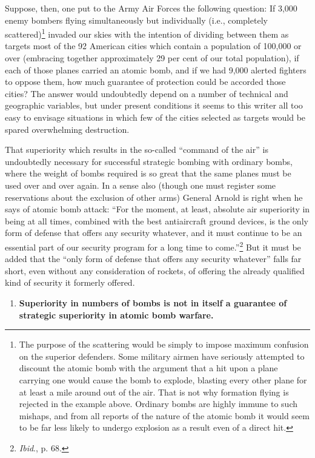 Suppose, then, one put to the Army Air Forces the following question: If 3,000 enemy bombers flying simultaneously but individually (i.e., completely scattered)\footnote{The purpose of the scattering would be simply to impose maximum confusion on the superior defenders. Some military airmen have seriously attempted to discount the atomic bomb with the argument that a hit upon a plane carrying one would cause the bomb to explode, blasting every other plane for at least a mile around out of the air. That is not why formation flying is rejected in the example above. Ordinary bombs are highly immune to such mishaps, and from all reports of the nature of the atomic bomb it would seem to be far less likely to undergo explosion as a result even of a direct hit.} invaded our skies with the intention of dividing between them as targets most of the 92 American cities which contain a population of 100,000 or over (embracing together approximately 29 per cent of our total population), if each of those planes carried an atomic bomb, and if we had 9,000 alerted fighters to oppose them, how much guarantee of protection could be accorded those cities? The answer would undoubtedly depend on a number of technical and geographic variables, but under present conditions it seems to this writer all too easy to envisage situations in which few of the cities selected as targets would be spared overwhelming destruction.

That superiority which results in the so-called ``command of the air'' is undoubtedly necessary for successful strategic bombing with ordinary bombs, where the weight of bombs required is so great that the same planes must be used over and over again. In a sense also (though one must register some reservations about the exclusion of other arms) General Arnold is right when he says of atomic bomb attack: ``For the moment, at least, absolute air superiority in being at all times, combined with the best antiaircraft ground devices, is the only form of defense that offers any security whatever, and it must continue to be an essential part of our security program for a long time to come.''\footnote{\textit{Ibid}., p. 68.} But it must be added that the ``only form of defense that offers any security whatever'' falls far short, even without any consideration of rockets, of offering the already qualified kind of security it formerly offered.

\begin{enumerate}[resume*]

\item \textbf{Superiority in numbers of bombs is not in itself a guarantee of strategic superiority in atomic bomb warfare.}

\end{enumerate}

